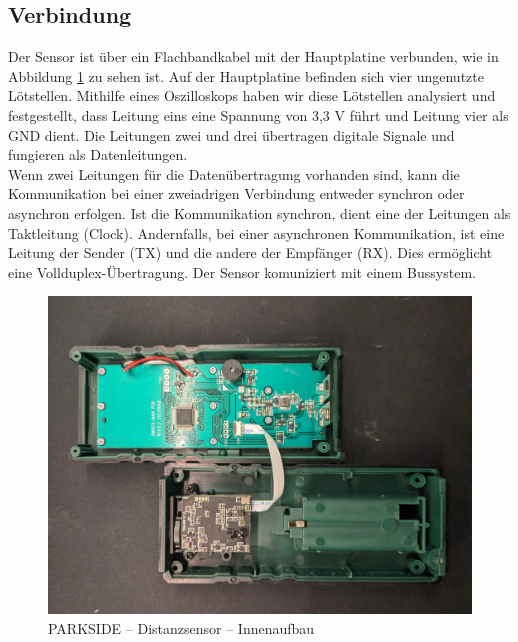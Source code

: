 \subsection{Verbindung}
Der Sensor ist über ein Flachbandkabel mit der Hauptplatine verbunden, wie in Abbildung \ref{img_2_2:sen_dis_parkside:1} zu sehen ist. Auf der Hauptplatine befinden sich vier ungenutzte Lötstellen. Mithilfe eines Oszilloskops haben wir diese Lötstellen analysiert und festgestellt, dass Leitung eins eine Spannung von 3,3 V führt und Leitung vier als GND dient. Die Leitungen zwei und drei übertragen digitale Signale und fungieren als Datenleitungen.\\
Wenn zwei Leitungen für die Datenübertragung vorhanden sind, kann die Kommunikation bei einer zweiadrigen Verbindung entweder synchron oder asynchron erfolgen. Ist die Kommunikation synchron, dient eine der Leitungen als Taktleitung (Clock). Andernfalls, bei einer asynchronen Kommunikation, ist eine Leitung der Sender (TX) und die andere der Empfänger (RX). Dies ermöglicht eine Vollduplex-Übertragung.
Der Sensor komuniziert mit einem Bussystem.



\pagebreak[1]
\begin{figure}[ht]
	\begin{center}
		\includegraphics[width=1\textwidth]{img/2_sen/dis_parkside_1_outside.png}
		\caption{PARKSIDE – Distanzsensor – Innenaufbau}
		\label{img_2_2:sen_dis_parkside:1}
	\end{center}
\end{figure}
\pagebreak[1]

